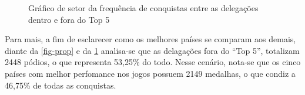\documentclass[
]{estat/estat}
\begin{document}
\begin{figure}[H]

\caption{\label{fig-setor}Gráfico de setor da frequência de conquistas
entre as delegações dentro e fora do Top 5}


\end{figure}%

Para mais, a fim de esclarecer como os melhores países se comparam aos
demais, diante da \ref{fig-prop} e da \ref{fig-setor} analisa-se que as
delagações fora do ``Top 5'', totalizam 2448 pódios, o que representa
53,25\% do todo. Nesse cenário, nota-se que os cinco países com melhor
perfomance nos jogos possuem 2149 medalhas, o que condiz a 46,75\% de
todas as conquistas.
\end{document}
